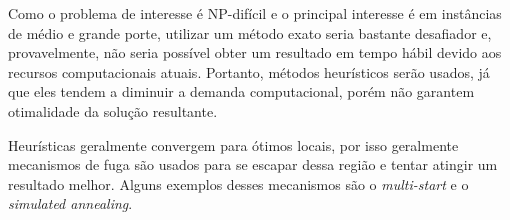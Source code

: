 Como o problema de interesse é NP-difícil e o principal interesse é em instâncias de médio e grande porte, utilizar um método exato seria bastante desafiador e, provavelmente, não seria possível obter um resultado em tempo hábil devido aos recursos computacionais atuais.
Portanto, métodos heurísticos serão usados, já que eles tendem a diminuir a demanda computacional, porém não garantem otimalidade da solução resultante.

Heurísticas geralmente convergem para ótimos locais, por isso geralmente mecanismos de fuga são usados para se escapar dessa região e tentar atingir um resultado melhor.
Alguns exemplos desses mecanismos são o \textit{multi-start} e o \textit{simulated annealing}.
